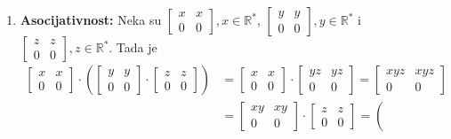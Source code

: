 \documentclass{exam}
\begin{document}
\begin{questions}
\begin{solution}
\begin{enumerate}
    \item \textbf{Asocijativnost:} Neka su $\displaystyle
      \begin{bmatrix}
        x & x\\
        0 & 0
      \end{bmatrix}, x \in \mathbb{R}^*$, $\displaystyle
      \begin{bmatrix}
        y & y\\
        0 & 0
      \end{bmatrix}, y \in \mathbb{R}^*$ i $\displaystyle
      \begin{bmatrix}
        z & z\\
        0 & 0
      \end{bmatrix}, z \in \mathbb{R}^*$. Tada je
      \begin{align*}
        \begin{bmatrix}
          x & x\\
          0 & 0
        \end{bmatrix} \cdot
        \left(
          \begin{bmatrix}
            y & y\\
            0 & 0
          \end{bmatrix} \cdot
          \begin{bmatrix}
            z & z\\
            0 & 0
          \end{bmatrix}
        \right) &=
        \begin{bmatrix}
          x & x\\
          0 & 0
        \end{bmatrix} \cdot
        \begin{bmatrix}
          yz & yz\\
          0 & 0
        \end{bmatrix}
        =
        \begin{bmatrix}
          xyz & xyz\\
          0 & 0
        \end{bmatrix}\\
        &=
        \begin{bmatrix}
          xy & xy\\
          0 & 0
        \end{bmatrix} \cdot
        \begin{bmatrix}
          z & z\\
          0 & 0
        \end{bmatrix}
        =
        \left(

\end{align*}
\end{enumerate}
\end{solution}
\end{questions}
\end{document}
